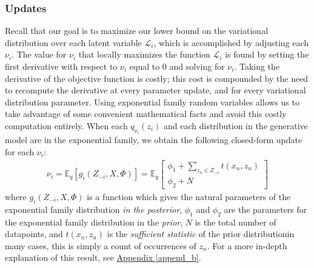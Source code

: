 \documentclass[12pt,letterpaper]{article}
\begin{document}
\subsubsection{Updates}
Recall that our goal is to maximize our lower bound on the variational distribution over each latent variable $\mathcal{L}_i$, which is accomplished by adjusting each $\nu_i$. The value for $\nu_i$ that locally maximizes the function $\mathcal{L}_i$ is found by setting the first derivative with respect to $\nu_i$ equal to 0 and solving for $\nu_i$. Taking the derivative of the objective function is costly; this cost is compounded by the need to recompute the derivative at every parameter update, and for every variational distribution parameter. Using exponential family random variables allows us to take advantage of some convenient mathematical facts and avoid this costly computation entirely. When each $q_{\nu_i}(z_i)$ and each distribution in the generative model are in the exponential family, we obtain the following closed-form update for each $\nu_i$: 
\begin{align}
\nu_i = \mathbb{E}_q[g_i(Z_{-i}, X, \Phi)] = \mathbb{E}_q \begin{bmatrix} \phi_1 + \sum\limits_{z_n \in Z_{-i}} t(x_n, z_n) \\ \phi_2 + N \end{bmatrix}
\end{align}
where $g_i(Z_{-i}, X, \Phi)$ is a function which gives the natural parameters of the exponential family distribution \textit{in the posterior}, $\phi_1$ and $\phi_2$ are the parameters for the exponential family distribution in the \textit{prior}, $N$ is the total number of datapoints, and $t(x_n, z_n)$ is the \textit{sufficient statistic} of the prior distribution\textemdash in many cases, this is simply a count of occurrences of $z_n$. For a more in-depth explanation of this result, see \hyperref[append_b]{Appendix \ref*{append_b}}. 
\end{document}

